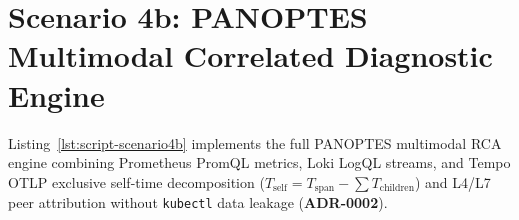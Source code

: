 \section{Scenario 4b: PANOPTES Multimodal Correlated Diagnostic Engine}
\label{sec:app-script-scenario4b}

Listing~\ref{lst:script-scenario4b} implements the full PANOPTES multimodal RCA engine combining Prometheus PromQL metrics, Loki LogQL streams, and Tempo OTLP exclusive self-time decomposition ($T_{\text{self}} = T_{\text{span}} - \sum T_{\text{children}}$) and L4/L7 peer attribution without \texttt{kubectl} data leakage (\textbf{ADR-0002}).


